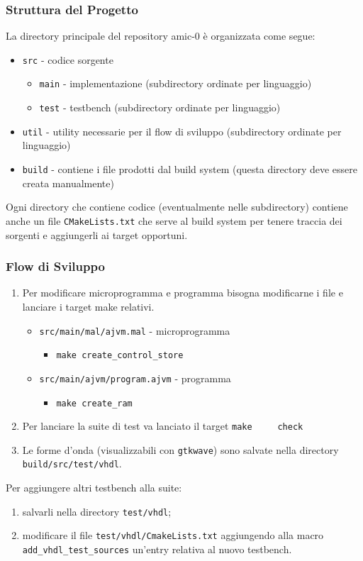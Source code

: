 \documentclass{beamer}
\begin{document}
\begin{frame}
  \frametitle{Struttura del Progetto}
  La directory principale del repository amic-0 è organizzata come segue:
\begin{itemize}
  \item \lstinline{src} - codice sorgente
  \begin{itemize}
    \item \lstinline{main} - implementazione (subdirectory ordinate per
    linguaggio)
    \item \lstinline{test} - testbench (subdirectory ordinate per linguaggio)
  \end{itemize}
  \item \lstinline{util} - utility necessarie per il flow di sviluppo
  (subdirectory ordinate per linguaggio)
  \item \lstinline{build} - contiene i file prodotti dal build system (questa
  directory deve essere creata manualmente)
\end{itemize}

Ogni directory che contiene codice (eventualmente nelle subdirectory) contiene
anche un file \lstinline{CMakeLists.txt} che serve al build system per tenere
traccia dei sorgenti e aggiungerli ai target opportuni.
\end{frame}

\begin{frame}
  \frametitle{Flow di Sviluppo}
  \begin{enumerate}
    \item Per modificare microprogramma e programma bisogna modificarne i file e
    lanciare i target make relativi.
  \begin{itemize}
    \item \lstinline{src/main/mal/ajvm.mal} - microprogramma
    \begin{itemize}
      \item \lstinline{make create_control_store}
    \end{itemize}
    \item \lstinline{src/main/ajvm/program.ajvm} - programma
    \begin{itemize}
      \item \lstinline{make create_ram}
    \end{itemize}
  \end{itemize}
  \item Per lanciare la suite di test va lanciato il target \lstinline{make
    check}
  \item Le forme d'onda (visualizzabili con \lstinline{gtkwave}) sono salvate
  nella directory \lstinline{build/src/test/vhdl}.
\end{enumerate}
Per aggiungere altri testbench alla suite:
\begin{enumerate}
  \item salvarli nella directory \lstinline{test/vhdl};
  \item modificare il file \lstinline{test/vhdl/CmakeLists.txt} aggiungendo alla
  macro \lstinline{add_vhdl_test_sources} un'entry relativa al nuovo testbench.
\end{enumerate}
\end{frame}
\end{document}
